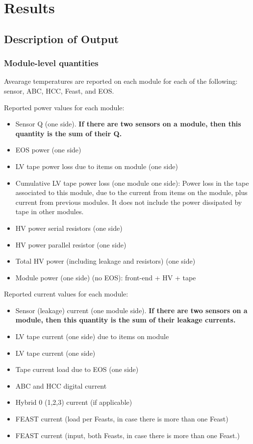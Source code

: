 
\newcommand{\mry}[2]{
\multirow{#1}{*}{Year #2}
}

\section{Results}

\subsection{Description of Output}
\subsubsection{Module-level quantities}
Avearage temperatures are reported on each module for each of the following: sensor, ABC, HCC, Feast,
and EOS.

Reported power values for each module: 
\begin{itemize}
\setlength\itemsep{0.0em}
\item Sensor Q (one side). {\bf If there are two sensors on a module, then this quantity is the sum of
their Q.}
\item EOS power (one side)
\item LV tape power loss due to items on module (one side)
\item Cumulative LV tape power loss (one module one side):
Power loss in the tape associated to this module, due to the current from items on the module, plus
current from previous modules. It does not include the power dissipated by tape in other modules.
\item HV power serial resistors (one side)
\item HV power parallel resistor (one side)
\item Total HV power (including leakage and resistors) (one side)
\item Module power (one side) (no EOS): front-end + HV + tape
\end{itemize}

Reported current values for each module:
\begin{itemize}
\setlength\itemsep{0.0em}
\item Sensor (leakage) current (one module side). {\bf If there are two sensors on a module, then this
quantity is the sum of their leakage currents.}
\item LV tape current (one side) due to items on module
\item LV tape current (one side)
\item Tape current load due to EOS (one side)
\item ABC and HCC digital current
\item Hybrid 0 (1,2,3) current (if applicable)
\item FEAST current (load per Feasts, in case there is more than one Feast)
\item FEAST current (input, both Feasts, in case there is more than one Feast.)
\end{itemize}

